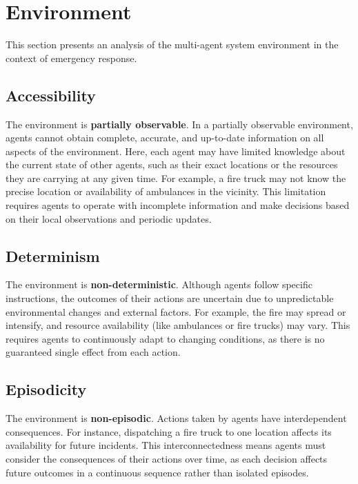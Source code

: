 \section{Environment}
\label{sec:environment}

This section presents an analysis of the multi-agent system environment in the context of emergency response. 


\subsection{Accessibility}

The environment is \textbf{partially observable}. In a partially observable environment, agents cannot obtain complete, accurate,
and up-to-date information on all aspects of the environment. Here, each agent may have limited knowledge about the current state of other agents,
such as their exact locations or the resources they are carrying at any given time. For example, a fire truck may not know the precise location or
availability of ambulances in the vicinity. This limitation requires agents to operate with incomplete information and make decisions based on their
local observations and periodic updates.

\subsection{Determinism}

The environment is \textbf{non-deterministic}. Although agents follow specific instructions, the outcomes of their actions are uncertain due to unpredictable
environmental changes and external factors. For example, the fire may spread or intensify, and resource availability (like ambulances or fire trucks) may vary.
This requires agents to continuously adapt to changing conditions, as there is no guaranteed single effect from each action.

\subsection{Episodicity}

The environment is \textbf{non-episodic}. Actions taken by agents have interdependent consequences. For instance, dispatching a fire truck to one location affects
its availability for future incidents. This interconnectedness means agents must consider the consequences of their actions over time, as each decision affects
future outcomes in a continuous sequence rather than isolated episodes.

